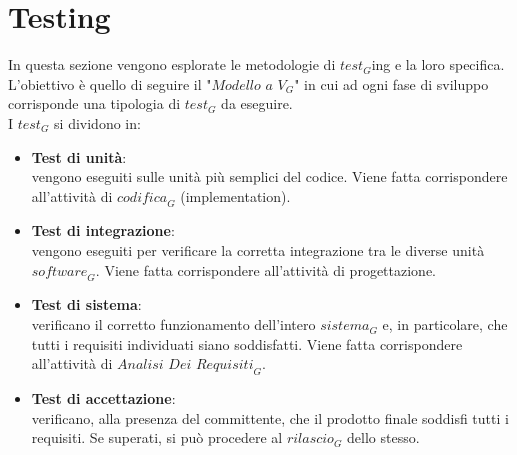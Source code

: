 

\section{Testing}
In questa sezione vengono esplorate le metodologie di $\textit{test}_G$ing e la loro specifica. L'obiettivo è quello di seguire il "$\textit{Modello a V}_G$" in cui ad ogni fase di sviluppo corrisponde una tipologia di $\textit{test}_G$ da eseguire.\\
I $\textit{test}_G$ si dividono in:
\begin{itemize}
    \item \textbf{Test di unità}:\\
    vengono eseguiti sulle unità più semplici del codice. Viene fatta corrispondere all'attività di $\textit{codifica}_G$ (implementation).
    \item \textbf{Test di integrazione}:\\
    vengono eseguiti per verificare la corretta integrazione tra le diverse unità $\textit{software}_G$. Viene fatta corrispondere all'attività di progettazione.
    \item \textbf{Test di sistema}:\\
    verificano il corretto funzionamento dell'intero $\textit{sistema}_G$ e, in particolare, che tutti i requisiti individuati siano soddisfatti. Viene fatta corrispondere all'attività di $\textit{Analisi Dei Requisiti}_G$. 
    \item \textbf{Test di accettazione}:\\
    verificano, alla presenza del committente, che il prodotto finale soddisfi tutti i requisiti. Se superati, si può procedere al $\textit{rilascio}_G$ dello stesso.
\end{itemize}
